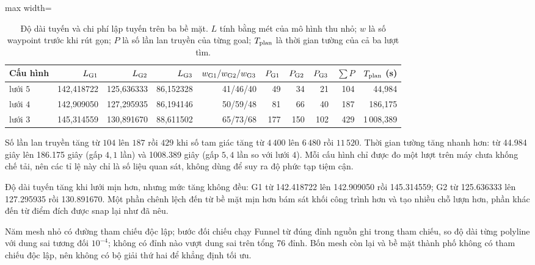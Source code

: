 \begin{table}[!t]
  \caption{Độ dài tuyến và chi phí lập tuyến trên ba bề mặt. $L$ tính bằng mét của
    mô hình thu nhỏ; $w$ là số waypoint trước khi rút gọn; $P$ là số lần lan truyền của
    từng goal; $T_{\rm plan}$ là thời gian tường của cả ba lượt tìm.}
  \label{tab:planning}
  {\fontsize{7}{8.6}\selectfont
  \begin{adjustbox}{max width=\textwidth}
  \begin{tabular}{@{}lrrrrrrrrr@{}}
    \toprule
    Cấu hình & $L_{\rm G1}$ & $L_{\rm G2}$ & $L_{\rm G3}$
      & $w_{\rm G1}/w_{\rm G2}/w_{\rm G3}$
      & $P_{\rm G1}$ & $P_{\rm G2}$ & $P_{\rm G3}$ & $\sum P$ & $T_{\rm plan}$ (s) \\
    \midrule
    lưới $5$ & 142,418722 & 125,636333 & 86,152328 & 41/46/40 & 49  & 34  & 21  & 104 & 44,984 \\
    lưới $4$ & 142,909050 & 127,295935 & 86,194146 & 50/59/48 & 81  & 66  & 40  & 187 & 186,175 \\
    lưới $3$ & 145,314559 & 130,891670 & 88,611502 & 65/73/68 & 177 & 150 & 102 & 429 & 1\,008,389 \\
    \bottomrule
  \end{tabular}
  \end{adjustbox}}
\end{table}

Số lần lan truyền tăng từ $104$ lên $187$ rồi $429$ khi số tam giác tăng từ
$4\,400$ lên $6\,480$ rồi $11\,520$. Thời gian tường tăng nhanh hơn: từ
\num{44.984} giây lên \num{186.175} giây (gấp $4{,}1$ lần) và \num{1008.389}
giây (gấp $5{,}4$ lần so với lưới $4$). Mỗi cấu hình chỉ được đo một lượt trên
máy chưa khống chế tải, nên các tỉ lệ này chỉ là số liệu quan sát, không dùng để
suy ra độ phức tạp tiệm cận.

Độ dài tuyến tăng khi lưới mịn hơn, nhưng mức tăng không đều: G1 từ
\num{142.418722} lên \num{142.909050} rồi \num{145.314559}; G2 từ
\num{125.636333} lên \num{127.295935} rồi \num{130.891670}. Một phần chênh lệch
đến từ bề mặt mịn hơn bám sát khối công trình hơn và tạo nhiều chỗ lượn hơn,
phần khác đến từ điểm đích được snap lại như đã nêu.

Năm mesh nhỏ có đường tham chiếu độc lập; bước đối chiếu chạy Funnel từ đúng đỉnh
nguồn ghi trong tham chiếu, so độ dài từng polyline với dung sai tương đối
$10^{-4}$; không có đỉnh nào vượt dung sai trên tổng 76 đỉnh. Bốn mesh còn lại và bề mặt
thành phố không có tham chiếu độc lập, nên không có bộ giải thứ hai để khẳng định
tối ưu.

